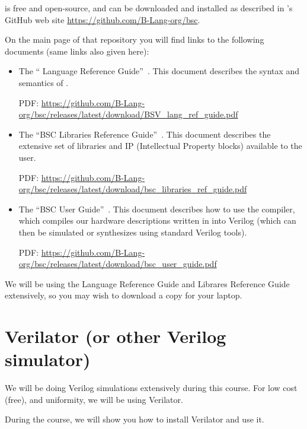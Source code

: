 {\bsc} is free and open-source, and can be downloaded and installed as
described in {\BSV}'s GitHub web site
\url{https://github.com/B-Lang-org/bsc}.

On the main page of that repository you will find links to the
following documents (same links also given here):

\begin{itemize}

  \item The ``{\BSV} Language Reference
  Guide''~\cite{BSV_Lang_Ref_Guide}.  This document describes the
  syntax and semantics of {\BSV}.

  PDF: \url{https://github.com/B-Lang-org/bsc/releases/latest/download/BSV_lang_ref_guide.pdf}

  \item The ``BSC Libraries Reference
  Guide''~\cite{bsc_libs_ref_guide}.  This document describes the
  extensive set of libraries and IP (Intellectual Property blocks)
  available to the {\BSV} user.

  PDF: \url{https://github.com/B-Lang-org/bsc/releases/latest/download/bsc_libraries_ref_guide.pdf}

  \item The ``BSC User Guide''~\cite{bsc_user_guide}.  This document
  describes how to use the {\bsc} compiler, which compiles our
  hardware descriptions written in {\BSV} into Verilog (which can then
  be simulated or synthesizes using standard Verilog tools).

  PDF: \url{https://github.com/B-Lang-org/bsc/releases/latest/download/bsc_user_guide.pdf}

\end{itemize}

We will be using the Language Reference Guide and Librares Reference
Guide extensively, so you may wish to download a copy for your laptop.


\section{Verilator (or other Verilog simulator)}

We will be doing Verilog simulations extensively during this course.
For low cost (free), and uniformity, we will be using Verilator.

During the course, we will show you how to install Verilator and use it.

